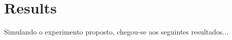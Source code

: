 %
%
%
%
%

%
%
%
%
%


\chapter{Results} \label{ch:results}

Simulando o experimento proposto, chegou-se aos seguintes resultados...
